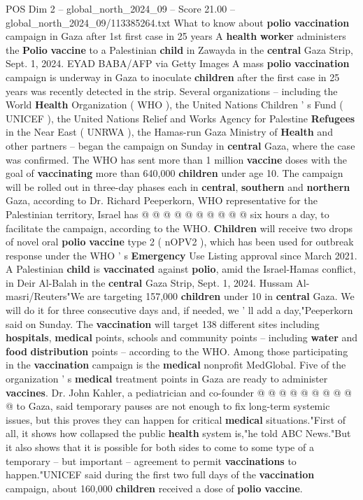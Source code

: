 \begin{textsample}{POS Dim 2 – global\_north\_2024\_09 – Score 21.00 – global\_north\_2024\_09/113385264.txt}  \label{ex:f2_pos_420}
What to know about \textbf{polio} \textbf{vaccination} campaign in Gaza after 1st first case in 25 years A \textbf{health} \textbf{worker} administers the \textbf{Polio} \textbf{vaccine} to a Palestinian \textbf{child} in Zawayda in the \textbf{central} Gaza Strip, Sept. 1, 2024.
EYAD BABA/AFP via Getty Images A mass \textbf{polio} \textbf{vaccination} campaign is underway in Gaza to inoculate \textbf{children} after the first case in 25 years was recently detected in the strip.
Several organizations -- including the World \textbf{Health} Organization ( WHO ), the United Nations Children ' s Fund ( UNICEF ), the United Nations Relief and Works Agency for Palestine \textbf{Refugees} in the Near East ( UNRWA ), the Hamas-run Gaza Ministry of \textbf{Health} and other partners -- began the campaign on Sunday in \textbf{central} Gaza, where the case was confirmed.
The WHO has sent more than 1 million \textbf{vaccine} doses with the goal of \textbf{vaccinating} more than 640,000 \textbf{children} under age 10.
The campaign will be rolled out in three-day phases each in \textbf{central}, \textbf{southern} and \textbf{northern} Gaza, according to Dr.
Richard Peeperkorn, WHO representative for the Palestinian territory, Israel has @ @ @ @ @ @ @ @ @ @ six hours a day, to facilitate the campaign, according to the WHO. \textbf{Children} will receive two drops of novel oral \textbf{polio} \textbf{vaccine} type 2 ( nOPV2 ), which has been used for outbreak response under the WHO ' s \textbf{Emergency} Use Listing approval since March 2021.
A Palestinian \textbf{child} is \textbf{vaccinated} against \textbf{polio}, amid the Israel-Hamas conflict, in Deir Al-Balah in the \textbf{central} Gaza Strip, Sept. 1, 2024.
Hussam Al-masri/Reuters"We are targeting 157,000 \textbf{children} under 10 in \textbf{central} Gaza.
We will do it for three consecutive days and, if needed, we ' ll add a day,"Peeperkorn said on Sunday.
The \textbf{vaccination} will target 138 different sites including \textbf{hospitals}, \textbf{medical} points, schools and community points -- including \textbf{water} and \textbf{food} \textbf{distribution} points -- according to the WHO.
Among those participating in the \textbf{vaccination} campaign is the \textbf{medical} nonprofit MedGlobal.
Five of the organization ' s \textbf{medical} treatment points in Gaza are ready to administer \textbf{vaccines}.
Dr.
John Kahler, a pediatrician and co-founder @ @ @ @ @ @ @ @ @ @ to Gaza, said temporary pauses are not enough to fix long-term systemic issues, but this proves they can happen for critical \textbf{medical} situations."First of all, it shows how collapsed the public \textbf{health} system is,"he told ABC News."But it also shows that it is possible for both sides to come to some type of a temporary -- but important -- agreement to permit \textbf{vaccinations} to happen."UNICEF said during the first two full days of the \textbf{vaccination} campaign, about 160,000 \textbf{children} received a dose of \textbf{polio} \textbf{vaccine}.

\end{textsample}
